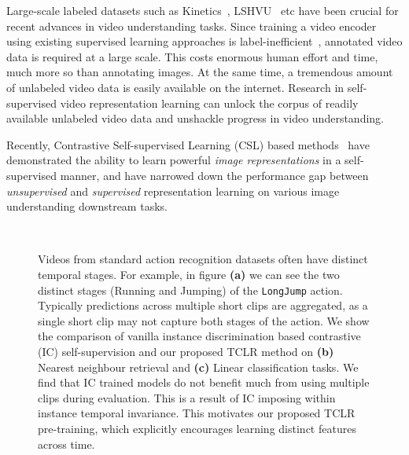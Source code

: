 \documentclass[10pt,twocolumn,letterpaper]{article}
\begin{document}
Large-scale labeled datasets such as Kinetics~\cite{kinetics}, LSHVU~\cite{diba2020large} etc have been crucial for recent advances in video understanding tasks. Since training a video encoder using existing supervised learning approaches is label-inefficient~\cite{kenshohara_mega_scale}, annotated video data is required at a large scale. This costs enormous human effort and time, much more so than annotating images. At the same time, a tremendous amount of unlabeled video data is easily available on the internet. Research in self-supervised video representation learning can unlock the corpus of readily available unlabeled video data and unshackle progress in video understanding.

Recently, Contrastive Self-supervised Learning (CSL) based methods~\cite{simclr, moco, swav} have demonstrated the ability to learn powerful {\em image representations} in a self-supervised manner, and have narrowed down the performance gap between {\em unsupervised} and {\em supervised} representation learning on various image understanding downstream tasks.




\begin{figure}
    \centering
     \\
    \hspace*{-0.4em}
    \caption{Videos from standard action recognition datasets often have distinct temporal stages. For example, in figure \textbf{(a)} we can see the two distinct stages (Running and Jumping) of the \texttt{LongJump} action. Typically predictions across multiple short clips are aggregated, as a single short clip may not capture both stages of the action. We show the comparison of vanilla instance discrimination based contrastive (IC) self-supervision and our proposed TCLR method on \textbf{(b)} Nearest neighbour retrieval and \textbf{(c)} Linear classification tasks. We find that IC trained models do not benefit much from using multiple clips during evaluation. This is a result of IC imposing within instance temporal invariance. This motivates our proposed TCLR pre-training, which explicitly encourages learning distinct features across time.}
    \vspace{-4mm}
    \label{fig:intro}
    
    
\end{figure}
\end{document}
